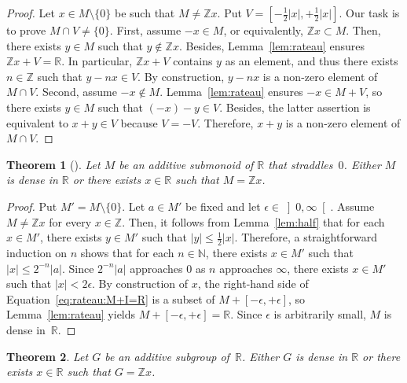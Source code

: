 \documentclass[12pt]{article}
\newcommand{\bZ}{\mathbb{Z}}
\newcommand{\bN}{\mathbb{N}} %
\newcommand{\bR}{\mathbb{R}}
\newcommand{\Rpos}{\left]0, \infty\right[} %
\newcommand{\abs}[1]{\left| #1 \right|}
\newcommand{\thalf}{\tfrac{1}{2}}
\newtheorem{theorem}{Theorem}
\theoremstyle{definition}
\begin{document}
\begin{proof}
  Let $x \in M \setminus \{ 0 \}$ be such that $M \ne \bZ x$.
  Put $V = \left[- \thalf \abs{x}, + \thalf \abs{x} \right]$.
  Our task is to prove $M \cap V \ne \{ 0 \}$.
  First, assume $- x \in M$, or equivalently, $\bZ x \subset M$.
  Then, there exists $y \in M$ such that $y \notin \bZ x$.
  Besides, Lemma~\ref{lem:rateau} ensures $\bZ x + V = \bR$.
  In particular, $\bZ x + V$ contains $y$ as an element,
  and thus there exists $n \in \bZ$ such that $y - n x \in V$.
  By construction, $y - n x$ is a non-zero element of $M \cap V$.
  Second, assume $- x \notin M$.
  Lemma~\ref{lem:rateau} ensures $- x \in M + V$,
  so there exists $y \in M$ such that $(- x) - y \in V$.
  Besides, the latter assertion is equivalent to $x + y \in V$ because $V = - V$.
  Therefore, $x + y$ is a non-zero element of $M \cap V$.
\end{proof}

\begin{theorem}[\cite{AbelsManoussos2012}] \label{thm:additive-submonoid-R}
  Let $M$ be an additive submonoid of $\bR$ that straddles~$0$.
  Either $M$ is dense in $\bR$ or there exists $x \in \bR$ such that $M = \bZ x$.
\end{theorem}

\begin{proof}
  Put $M' = M \setminus \{ 0 \}$.
  Let $a \in M'$ be fixed and let $\epsilon \in \Rpos$.
  Assume $M \ne \bZ x$ for every $x \in \bZ$.
  Then, it follows from Lemma~\ref{lem:half} that for each $x \in M'$,
  there exists $y \in M'$ such that $\abs{y} \le \thalf \abs{x}$.
  Therefore, a straightforward induction on $n$ shows that for each $n \in \bN$,
  there exists $x \in M'$ such that $\abs{x} \le 2^{- n} \abs{a}$.
  Since $2^{-n} \abs{a}$ approaches $0$ as $n$ approaches $\infty$,
  there exists $x \in M'$ such that $\abs{x} < 2 \epsilon$.
  By construction of $x$,
  the right-hand side of Equation~\eqref{eq:rateau:M+I=R} is a subset of $M + [- \epsilon, + \epsilon]$,
  so Lemma~\ref{lem:rateau} yields $M + [- \epsilon, + \epsilon] = \bR$.
  Since $\epsilon$ is arbitrarily small, $M$ is dense in~$\bR$.
\end{proof}


\begin{theorem} \label{thm:additive-subgroup-R}
  Let $G$ be an additive subgroup of~$\bR$.
  Either $G$ is dense in $\bR$ or there exists $x \in \bR$ such that $G = \bZ x$.
\end{theorem}
\end{document}
